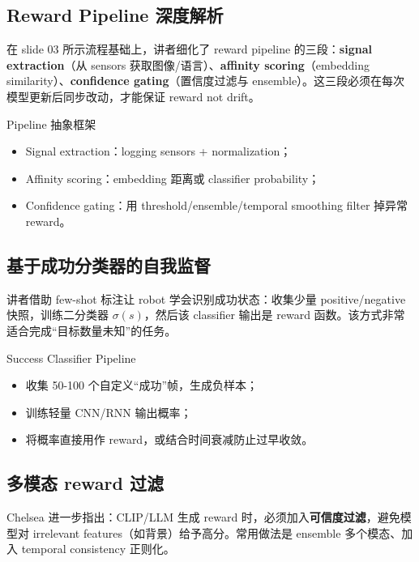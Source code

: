 \subsection{Reward Pipeline 深度解析}
在 slide 03 所示流程基础上，讲者细化了 reward pipeline 的三段：\textbf{signal extraction}（从 sensors 获取图像/语言）、\textbf{affinity scoring}（embedding similarity）、\textbf{confidence gating}（置信度过滤与 ensemble）。这三段必须在每次模型更新后同步改动，才能保证 reward not drift。

\begin{importantbox}{Pipeline 抽象框架}
\begin{itemize}
\item Signal extraction：logging sensors + normalization；\\
\item Affinity scoring：embedding 距离或 classifier probability；\\
\item Confidence gating：用 threshold/ensemble/temporal smoothing filter 掉异常 reward。
\end{itemize}
\end{importantbox}

\subsection{基于成功分类器的自我监督}
讲者借助 few-shot 标注让 robot 学会识别成功状态：收集少量 positive/negative 快照，训练二分类器 $\sigma(s)$，然后该 classifier 输出是 reward 函数。该方式非常适合完成“目标数量未知”的任务。

\begin{knowledgebox}{Success Classifier Pipeline}
\begin{itemize}
\item 收集 50-100 个自定义“成功”帧，生成负样本；\\
\item 训练轻量 CNN/RNN 输出概率；\\
\item 将概率直接用作 reward，或结合时间衰减防止过早收敛。
\end{itemize}
\end{knowledgebox}

\subsection{多模态 reward 过滤}
Chelsea 进一步指出：CLIP/LLM 生成 reward 时，必须加入\textbf{可信度过滤}，避免模型对 irrelevant features（如背景）给予高分。常用做法是 ensemble 多个模态、加入 temporal consistency 正则化。


